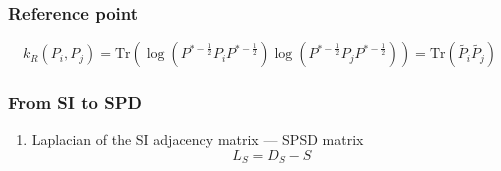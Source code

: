 \documentclass{beamer}
\begin{document}


\begin{frame}
\frametitle{Reference point}
	\begin{equation*}
k_R(P_i,P_j) = \text{Tr}( \log (P^{*-\frac12}P_i P^{*-\frac12}) \log (P^{*-\frac12}P_j P^{*-\frac12})) =	\text{Tr}(\tilde{P_i}\tilde{P_j})
\end{equation*}

\end{frame}



\begin{frame}
\frametitle{From SI to SPD}
\begin{enumerate}
\item Laplacian of the SI adjacency matrix  --- SPSD matrix
\begin{equation*}
L_S = D_S - S
\end{equation*}
\vfill
{}
\end{enumerate}

\end{frame}

\end{document}
